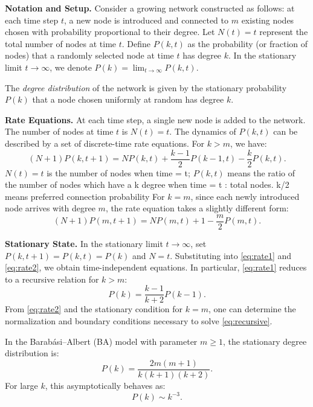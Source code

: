 \documentclass{article}
\begin{document}
\noindent\textbf{Notation and Setup.}  
Consider a growing network constructed as follows: at each time step $t$, a new node is introduced and connected to $m$ existing nodes chosen with probability proportional to their degree. Let $N(t)=t$ represent the total number of nodes at time $t$. Define $P(k,t)$ as the probability (or fraction of nodes) that a randomly selected node at time $t$ has degree $k$. In the stationary limit $t \to \infty$, we denote $P(k)=\lim_{t\to\infty} P(k,t)$.

\begin{definition}
The \emph{degree distribution} of the network is given by the stationary probability $P(k)$ that a node chosen uniformly at random has degree $k$.
\end{definition}

\noindent\textbf{Rate Equations.}  
At each time step, a single new node is added to the network. The number of nodes at time $t$ is $N(t)=t$. The dynamics of $P(k,t)$ can be described by a set of discrete-time rate equations. For $k>m$, we have:
\begin{equation}
(N+1)P(k,t+1) = N P(k,t) + \frac{k-1}{2}P(k-1,t) - \frac{k}{2}P(k,t).
\label{eq:rate1}
\end{equation}
$N(t) = t$ is the number of nodes when time = t; $P(k, t)$ means the ratio of the number of nodes which have a k degree when time = t : total nodes. k/2 means preferred connection probability
For $k=m$, since each newly introduced node arrives with degree $m$, the rate equation takes a slightly different form:
\begin{equation}
(N+1)P(m,t+1) = N P(m,t) + 1 - \frac{m}{2} P(m,t).
\label{eq:rate2}
\end{equation}

\noindent\textbf{Stationary State.}  
In the stationary limit $t \to \infty$, set $P(k,t+1)=P(k,t)=P(k)$ and $N=t$. Substituting into \eqref{eq:rate1} and \eqref{eq:rate2}, we obtain time-independent equations. In particular, \eqref{eq:rate1} reduces to a recursive relation for $k>m$:
\begin{equation}
P(k) = \frac{k-1}{k+2} P(k-1).
\label{eq:recursive}
\end{equation}
From \eqref{eq:rate2} and the stationary condition for $k=m$, one can determine the normalization and boundary conditions necessary to solve \eqref{eq:recursive}.

\begin{theorem}
In the Barabási–Albert (BA) model with parameter $m\geq 1$, the stationary degree distribution is:
\begin{equation}
P(k) = \frac{2m(m+1)}{k(k+1)(k+2)}.
\end{equation}
For large $k$, this asymptotically behaves as:
\begin{equation}
P(k) \sim k^{-3}.
\end{equation}
\end{theorem}
\end{document}
